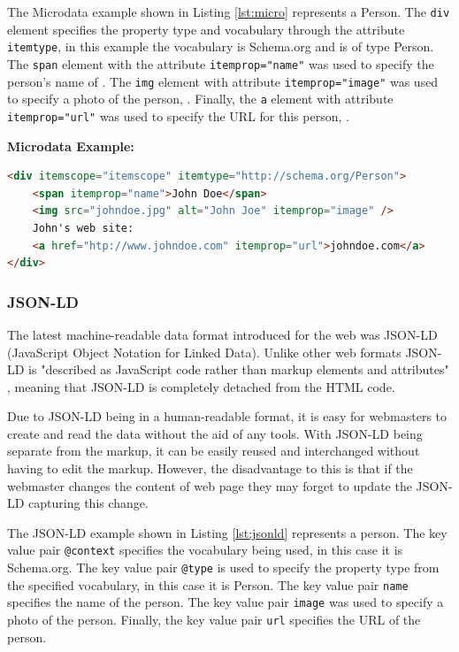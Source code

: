 \newpage
The Microdata example shown in Listing \ref{lst:micro} represents a Person. The \texttt{div} element specifies the property type and vocabulary through the attribute \texttt{itemtype}, in this example the vocabulary is Schema.org and is of type Person.  The \texttt{span} element with the attribute \texttt{itemprop="name"} was used to specify the person's name of . The \texttt{img} element with attribute \texttt{itemprop="image"} was used to specify a photo of the person, . Finally, the \texttt{a} element with attribute \texttt{itemprop="url"} was used to specify the URL for this person, .\newline


\noindent
\textbf{Microdata Example:}
{
\begin{lstlisting}[language=HTML,caption={A Microdata Example},captionpos=b,label={lst:micro}]
<div itemscope="itemscope" itemtype="http://schema.org/Person">
    <span itemprop="name">John Doe</span>
    <img src="johndoe.jpg" alt="John Joe" itemprop="image" />
    John's web site:
    <a href="htp://www.johndoe.com" itemprop="url">johndoe.com</a>
</div>
\end{lstlisting}
}

\subsubsection{JSON-LD}\label{sec:jsonld}
The latest machine-readable data format introduced for the web was JSON-LD (JavaScript Object Notation for Linked Data). Unlike other web formats JSON-LD is "described as JavaScript code rather than markup elements and attributes" \cite{sikos2015mastering}, meaning that JSON-LD is completely detached from the HTML code. 

Due to JSON-LD being in a human-readable format, it is easy for webmasters to create and read the data without the aid of any tools. With JSON-LD being separate from the markup, it can be easily reused and interchanged without having to edit the markup. However, the disadvantage to this is that if the webmaster changes the content of web page they may forget to update the JSON-LD capturing this change. 

The JSON-LD example shown in Listing \ref{lst:jsonld} represents a person. The key value pair \texttt{@context} specifies the vocabulary being used, in this case it is Schema.org. The key value pair \texttt{@type} is used to specify the property type from the specified vocabulary, in this case it is Person. The key value pair \texttt{name} specifies the name of the person. The key value pair \texttt{image} was used to specify a photo of the person. Finally, the key value pair \texttt{url} specifies the URL of the person.
\newline

